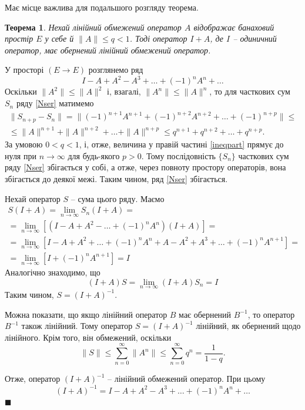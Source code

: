\documentclass[14pt,twoside]{extreport}
\theoremstyle{mystyle}
\newtheorem{thm}{Теорема}
\renewenvironment{proof}{{\bfseries Доведення.}}{$\blacksquare$}
\numberwithin{equation}{chapter}
\begin{document}
Має місце важлива для подальшого розгляду теорема.

\begin{thm}\label{recipthm}
	Нехай лінійний обмежений оператор $A$ відображає банаховий простір $E$ у себе й $\|A\| \leqslant q <1$. Тоді оператор $I+A$, де $I$ -- одиничний оператор, має обернений лінійний обмежений оператор.
\end{thm}
\begin{proof}
	У просторі $(E\to E)$ розглянемо ряд
	\begin{equation}\label{Nser}
	I-A+A^2-A^3+ \ldots + (-1)^n A^n+\ldots
	\end{equation}
	Оскільки $\|A^2\|\leqslant\|A\|^2$ і, взагалі, $\|A^n\|\leqslant \|A\|^n$, то для часткових сум $S_n$ ряду \eqref{Nser} матимемо
	\begin{multline}\label{ineqpart}
	\|S_{n+p} - S_n\| = \|(-1)^{n+1}A^{n+1} + (-1)^{n+2} A^{n+2}+ \dots + (-1)^{n+p}\|\leqslant\\
	\leqslant \|A\|^{n+1} + \|A\|^{n+2}+\dots +\|A\|^{n+p}\leqslant q^{n+1} + q^{n+2} + \dots + q^{n+p}.
	\end{multline}
	За умовою $0<q<1$, і, отже, величина у правій частині \eqref{ineqpart} прямує до нуля при $n \to \infty$ для будь-якого $p>0$. Тому послідовність $\{S_n\}$ часткових сум ряду \eqref{Nser} збігається у собі, а отже, через повноту простору операторів, вона збігається до деякої межі. Таким чином, ряд \eqref{Nser} збігається.
	
	Нехай оператор $S$ -- сума цього ряду. Маємо
	\begin{multline*}
	S(I+A)=\lim\limits_{n\to\infty}S_n(I+A)=\\
	=\lim\limits_{n\to\infty}\left[(I-A+A^2-\dots+(-1)^nA^n)(I+A)\right]=\\
	=\lim\limits_{n\to\infty}\left[I-A+A^2+\dots+(-1)^nA^n+A-A^2+A^3+\dots+(-1)^{n}A^{n+1}\right]=\\
	=\lim\limits_{n\to\infty}\left[I+(-1)^nA^{n+1}\right]=I
	\end{multline*}
	Аналогічно знаходимо, що
	\[
	(I+A)S=\lim_{n \to \infty}(I+A)S_n=I
	\]
	Таким чином, $S=(I+A)^{-1}$.
	
	Можна показати, що якщо лінійний оператор $B$ має обернений $B^{-1}$, то оператор $B^{-1}$ також лінійний. Тому оператор $S = (I + A)^{-1}$ лінійний, як обернений щодо лінійного. Крім того, він обмежений, оскільки
	\[
	\|S\|\leqslant\sum\limits_{n=0}^{\infty}\|A^n\|\leqslant \sum\limits_{n=0}^{\infty} q^n = \dfrac{1}{1-q}.
	\]
	
	Отже, оператор $(I+A)^{-1}$ -- лінійний обмежений оператор. При цьому
	\begin{equation}
	(I+A)^{-1}=I-A+A^2-A^3+\dots+(-1)^nA^n+\dots
	\end{equation}
\end{proof}
\end{document}

